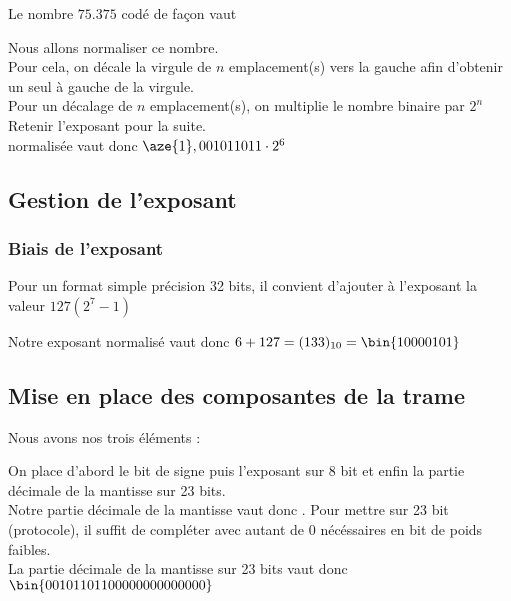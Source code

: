 Le nombre $75.375$ codé de façon  vaut 

Nous allons normaliser ce nombre. \\

Pour cela, on décale la virgule de $n$ emplacement(s) vers la gauche afin d'obtenir un seul  à gauche de la virgule. \\

Pour un décalage de $n$ emplacement(s), on multiplie le nombre binaire par $2^n$ \\

Retenir l'exposant  pour la suite. \\

 normalisée vaut donc $\aze{1},001011011 \cdot 2^6 $ 

\subsection{Gestion de l'exposant}

\subsubsection{Biais de l'exposant}

Pour un format simple précision 32 bits, il convient d'ajouter à l'exposant la valeur $127 (2^7-1)$

Notre exposant normalisé vaut donc $6+127=(133)_{10} = \bin{10000101}$

\subsection{Mise en place des composantes de la trame}

Nous avons nos trois éléments : 

On place d'abord le bit de signe puis l'exposant sur 8 bit et enfin la partie décimale de la mantisse sur 23 bits. \\

Notre partie décimale de la mantisse vaut donc . Pour mettre sur 23 bit (protocole), il suffit de compléter avec autant de 0 nécéssaires en bit de poids faibles. \\

La partie décimale de la mantisse sur 23 bits vaut donc $\bin{00101101100000000000000}$ \\


